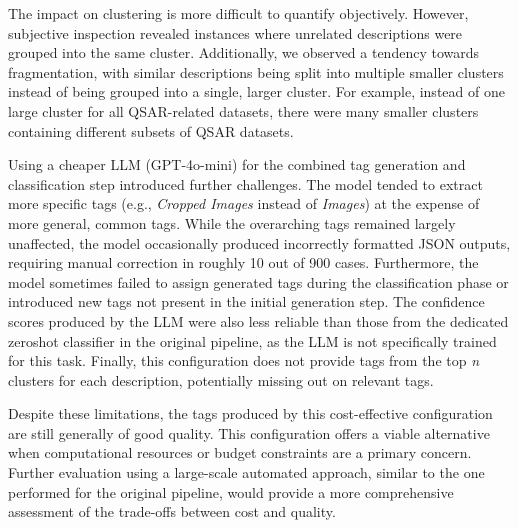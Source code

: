 The impact on clustering is more difficult to quantify objectively. However, subjective inspection revealed instances where unrelated descriptions were grouped into the same cluster. Additionally, we observed a tendency towards fragmentation, with similar descriptions being split into multiple smaller clusters instead of being grouped into a single, larger cluster. For example, instead of one large cluster for all QSAR-related datasets, there were many smaller clusters containing different subsets of QSAR datasets.

Using a cheaper LLM (GPT-4o-mini) for the combined tag generation and classification step introduced further challenges. The model tended to extract more specific tags (e.g., \textit{Cropped Images} instead of \textit{Images}) at the expense of more general, common tags. While the overarching tags remained largely unaffected, the model occasionally produced incorrectly formatted JSON outputs, requiring manual correction in roughly 10 out of 900 cases. Furthermore, the model sometimes failed to assign generated tags during the classification phase or introduced new tags not present in the initial generation step. The confidence scores produced by the LLM were also less reliable than those from the dedicated zeroshot classifier in the original pipeline, as the LLM is not specifically trained for this task. Finally, this configuration does not provide tags from the top \textit{n} clusters for each description, potentially missing out on relevant tags.

Despite these limitations, the tags produced by this cost-effective configuration are still generally of good quality. This configuration offers a viable alternative when computational resources or budget constraints are a primary concern. Further evaluation using a large-scale automated approach, similar to the one performed for the original pipeline, would provide a more comprehensive assessment of the trade-offs between cost and quality.



